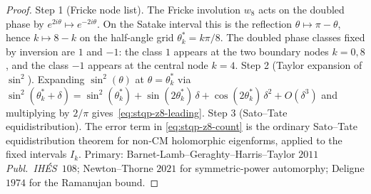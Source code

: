 \begin{proof}
\textup{Step 1 (Fricke node list).} The Fricke involution
$w_8$ acts on the doubled phase by
$e^{2i\theta}\mapsto e^{-2i\theta}$. On the Satake interval this is
the reflection $\theta\mapsto\pi-\theta$, hence
$k\mapsto 8-k$ on the half-angle grid $\theta_k^*=k\pi/8$.
The doubled phase classes fixed by inversion are $1$ and $-1$:
the class $1$ appears at the two boundary nodes $k=0,8$, and the
class $-1$ appears at the central node $k=4$.
\textup{Step 2 (Taylor expansion of $\sin^2$).} Expanding
$\sin^2(\theta)$ at $\theta = \theta^*_k$ via
$\sin^2(\theta^*_k + \delta) = \sin^2(\theta^*_k)
+ \sin(2\theta^*_k)\,\delta + \cos(2\theta^*_k)\,\delta^2
+ O(\delta^3)$
and multiplying by $2/\pi$ gives~\eqref{eq:stqp-z8-leading}.
\textup{Step 3 (Sato--Tate equidistribution).} The error term in
\eqref{eq:stqp-z8-count} is the ordinary Sato--Tate
equidistribution theorem for non-CM holomorphic eigenforms, applied
to the fixed intervals $I_k$. Primary: Barnet-Lamb--Geraghty--Harris--Taylor
$2011$ \emph{Publ.\ IH\'ES}~$108$; Newton--Thorne $2021$
for symmetric-power automorphy; Deligne $1974$ for the Ramanujan
bound.
\end{proof}

